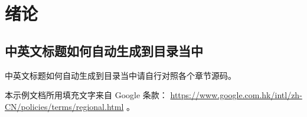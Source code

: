 \chapter{绪论}

\section{中英文标题如何自动生成到目录当中}

中英文标题如何自动生成到目录当中请自行对照各个章节源码。

本示例文档所用填充文字来自 Google 条款： \url{https://www.google.com.hk/intl/zh-CN/policies/terms/regional.html} 。